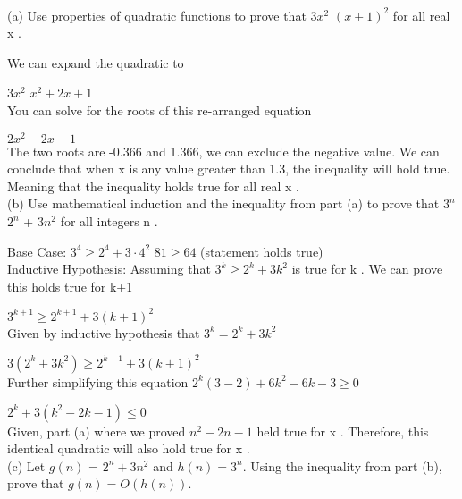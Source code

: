 \documentclass[11pt]{article}
\newcounter{prnum}
\newenvironment{problem}{{\vskip 0.2in\noindent\bf Problem
       \addtocounter{prnum}{1} \arabic{prnum}.}}{\vskip 0.1in}
\begin{document}

\begin{problem} \\

  (a) Use properties of quadratic functions to prove that 3$x^2$ \geq $(x + 1)^2$ for all real x . \\
  \smallskip

  We can expand the quadratic to 
  \smallskip

  $3x^2$ \geq $x^2+2x+1$ \\
  
  You can solve for the roots of this re-arranged equation
  \smallskip

  $2x^2 - 2x -1$  \\

  The two roots are -0.366 and 1.366, we can exclude the negative value.
  We can conclude that when x is any value greater than 1.3, the inequality will hold true.
  Meaning that the inequality holds true for all real x . \\
  

  (b) Use mathematical induction and the inequality from part (a) to prove that $3^n$ \geq $2^n$ + $3n^2$ for all integers n .\\
  \smallskip

  Base Case: $3^4 \geq 2^4 + 3 \cdot 4^2$ 
  \to $81 \geq 64$ (statement holds true) \\

  Inductive Hypothesis: Assuming that $3^k \geq 2^k + 3k^2$ is true for k .
  We can prove this holds true for k+1
  \smallskip
 
  $3^{k+1} \geq 2^{k+1} + 3(k+1)^2$ \\
  

  Given by inductive hypothesis that $3^k = 2^k + 3k^2$
  \smallskip

  $3(2^k + 3k^2) \geq 2^{k+1} + 3(k+1)^2$ \\

  Further simplifying this equation
  $2^k (3-2) + 6k^2 - 6k - 3 \geq 0$ 
  \smallskip

  $2^k + 3(k^2 - 2k -1) \leq 0$ \\

  Given, part (a) where we proved $n^2 - 2n -1$ held true for x .
   Therefore, this identical quadratic will also hold true for x . \\
 
  (c) Let $g(n)$ = $2^n + 3n^2$ and $h(n) = 3^n$. Using the inequality from part (b), prove that $g(n) = O(h(n)).$ \\


\end{problem}
\end{document}
